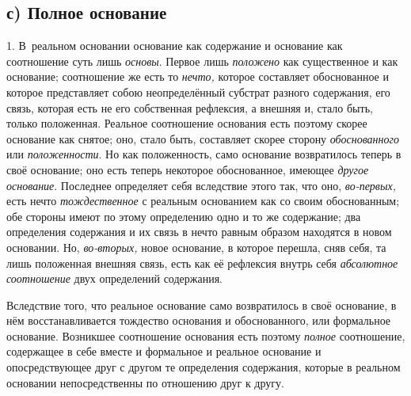 \subsection[с) Полное основание]{с) Полное основание}

1. В~реальном основании основание как содержание
и основание как соотношение суть лишь {\em основы}.
Первое лишь {\em положено} как существенное и как
основание; соотношение же есть то {\em нечто,} которое
составляет обоснованное и которое представляет собою неопределённый
субстрат разного содержания, его связь, которая есть не его собственная
рефлексия, а внешняя и, стало быть, только положенная. Реальное соотношение
основания есть поэтому скорее основание как снятое; оно, стало быть,
составляет скорее сторону {\em обоснованного} или
{\em положенности}. Но как положенность, само основание
возвратилось теперь в своё основание; оно есть теперь некоторое
обоснованное, имеющее {\em другое основание}. Последнее
определяет себя вследствие этого так, что оно,
{\em во-первых,} есть нечто
{\em тождественное} с реальным основанием как со своим
обоснованным; обе стороны имеют по этому определению одно и то же
содержание; два определения содержания и их связь в нечто равным образом
находятся в новом основании. Но, {\em во-вторых,} новое
основание, в которое перешла, сняв себя, та лишь положенная внешняя связь,
есть как её рефлексия внутрь себя {\em абсолютное
соотношение} двух определений содержания.

Вследствие того, что реальное основание само возвратилось в своё основание,
в нём восстанавливается тождество основания и обоснованного, или формальное
основание. Возникшее соотношение основания есть поэтому
{\em полное} соотношение, содержащее в себе вместе и
формальное и реальное основание и опосредствующее друг с другом те
определения содержания, которые в реальном основании непосредственны по
отношению друг к другу.

